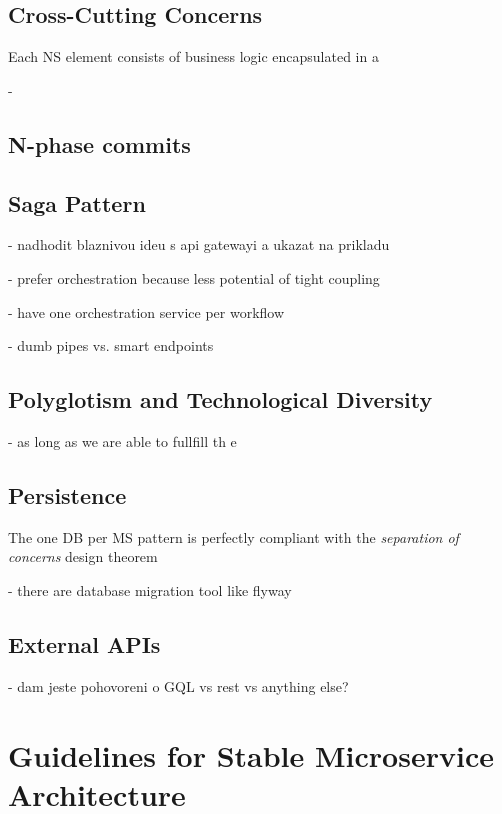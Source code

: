 \documentclass[thesis=M,english,hidelinks]{FITthesis}[2012/10/20]
\begin{document}
\section{Cross-Cutting Concerns}
\label{sec:ccc}

Each \acrshort{NS} element consists of business logic encapsulated in a 


- 


\section{N-phase commits}
\label{sec:appl:nphase}



\section{Saga Pattern}
\label{sec:appl:saga}

- nadhodit blaznivou ideu s api gatewayi a ukazat na prikladu

- prefer orchestration because less potential of tight coupling

- have one orchestration service per workflow

- dumb pipes vs. smart endpoints





\section{Polyglotism and Technological Diversity}


- as long as we are able to fullfill th e
\section{Persistence}
The one DB per \acrshort{MS} pattern is perfectly compliant with the \textit{separation of concerns} design theorem

- there are database migration tool like flyway

\section{External APIs}
- dam jeste pohovoreni o GQL vs rest vs anything else?

% 
% 
\chapter{Guidelines for Stable Microservice Architecture}
\label{sec:guidelines}
\end{document}

